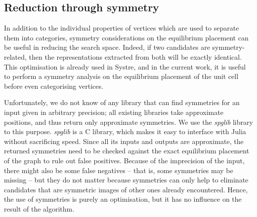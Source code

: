 \documentclass[main.tex]{subfiles}
\begin{document}
%

\subsection{Reduction through symmetry}
\label{symmetries}

In addition to the individual properties of vertices which are used to separate them into categories, symmetry considerations on the equilibrium placement can be useful in reducing the search space. Indeed, if two candidates are symmetry-related, then the representations extracted from both will be exactly identical. This optimisation is already used in Systre, and in the current work, it is useful to perform a symmetry analysis on the equilibrium placement of the unit cell before even categorising vertices.

Unfortunately, we do not know of any library that can find symmetries for an input given in arbitrary precision; all existing libraries take approximate positions, and thus return only approximate symmetries. We use the \textit{spglib} library \autocite{spglib} to this purpose. \textit{spglib} is a C library, which makes it easy to interface with Julia without sacrificing speed. Since all its inputs and outputs are approximate, the returned symmetries need to be checked against the exact equilibrium placement of the graph to rule out false positives. Because of the imprecision of the input, there might also be some false negatives -- that is, some symmetries may be missing -- but they do not matter because symmetries can only help to eliminate candidates that are symmetric images of other ones already encountered. Hence, the use of symmetries is purely an optimisation, but it has no influence on the result of the algorithm. %
\end{document}
